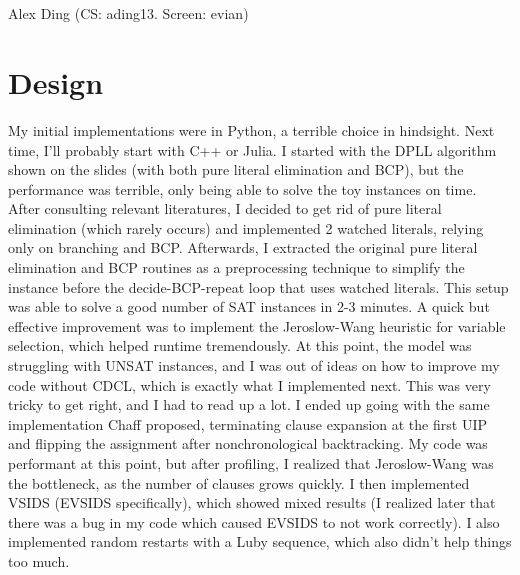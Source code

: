 \documentclass[10pt]{article}
\theoremstyle{definition} %
\begin{document}
\begin{center}
  \Large{} \\
  \normalsize{} \\
  \normalsize{Alex Ding (CS: ading13. Screen: evian)} \\
  \vspace{5pt}
\end{center}

\section{Design}

My initial implementations were in Python, a terrible choice in hindsight. Next time, I'll probably start with C++ or Julia. I started with the DPLL algorithm shown on the slides (with both pure literal elimination and BCP), but the performance was terrible, only being able to solve the toy instances on time. After consulting relevant literatures, I decided to get rid of pure literal elimination (which rarely occurs) and implemented 2 watched literals, relying only on branching and BCP. Afterwards, I extracted the original pure literal elimination and BCP routines as a preprocessing technique to simplify the instance before the decide-BCP-repeat loop that uses watched literals. This setup was able to solve a good number of SAT instances in 2-3 minutes. A quick but effective improvement was to implement the Jeroslow-Wang heuristic for variable selection, which helped runtime tremendously. At this point, the model was struggling with UNSAT instances, and I was out of ideas on how to improve my code without CDCL, which is exactly what I implemented next. This was very tricky to get right, and I had to read up a lot. I ended up going with the same implementation Chaff proposed, terminating clause expansion at the first UIP and flipping the assignment after nonchronological backtracking. My code was performant at this point, but after profiling, I realized that Jeroslow-Wang was the bottleneck, as the number of clauses grows quickly. I then implemented VSIDS (EVSIDS specifically), which showed mixed results (I realized later that there was a bug in my code which caused EVSIDS to not work correctly). I also implemented random restarts with a Luby sequence, which also didn't help things too much. 
\end{document}
